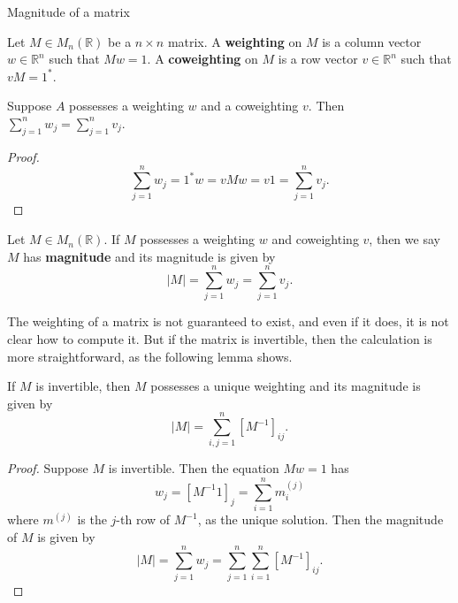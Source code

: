 \documentclass[12pt]{beamer}
\begin{document}
\begin{frame}[allowframebreaks]{Magnitude of a matrix}

\begin{definition}
Let $M \in M_n(\mathbb{R})$ be a $n\times n$ matrix. A \textbf{weighting} on $M$ is a column vector $w\in\mathbb{R}^n$ such that $Mw = 1$. A \textbf{coweighting} on $M$ is a row vector $v\in\mathbb{R}^n$ such that $vM = 1^\ast$.
\end{definition}

\framebreak

\begin{lemma}
Suppose $A$ possesses a weighting $w$ and a coweighting $v$. Then $\sum\limits_{j=1}^n w_j = \sum\limits_{j=1}^n v_j$.
\end{lemma}

\begin{proof}
\begin{equation*}
\sum\limits_{j=1}^nw_j = 1^\ast w = vMw = v1 = \sum\limits_{j=1}^nv_j.
\end{equation*}
\end{proof}

\framebreak

\begin{definition}
Let $M \in M_n(\mathbb{R})$. If $M$ possesses a weighting $w$ and coweighting $v$, then we say $M$ has \textbf{magnitude} and its magnitude is given by
\begin{equation*}
\vert M \vert = \sum\limits_{j=1}^nw_j = \sum\limits_{j=1}^nv_j.
\end{equation*}
\end{definition}

The weighting of a matrix is not guaranteed to exist, and even if it does, it is not clear how to compute it. But if the matrix is invertible, then the calculation is more straightforward, as the following lemma shows.

\framebreak

\begin{lemma}\label{lem:invertible}
If $M$ is invertible, then $M$ possesses a unique weighting and its magnitude is given by
\begin{equation*}
\vert M \vert = \sum\limits_{i,j=1}^n\left[M^{-1}\right]_{ij}.
\end{equation*}
\end{lemma}

\framebreak

\begin{proof}
Suppose $M$ is invertible. Then the equation $Mw = 1$
has
\begin{equation*}
w_j = \left[M^{-1}1\right]_j = \sum\limits_{i=1}^n m^{(j)}_i
\end{equation*}
where $m^{(j)}$ is the $j$-th row of $M^{-1}$, as the unique solution. Then the magnitude of $M$ is given by
\begin{equation*}
\vert M \vert = \sum\limits_{j=1}^n w_j = \sum\limits_{j=1}^n\sum\limits_{i=1}^n \left[M^{-1}\right]_{ij}.
\end{equation*}
\end{proof}

\end{frame}
\end{document}
